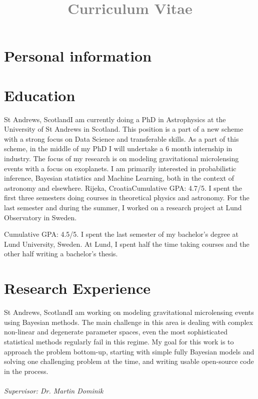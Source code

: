 \documentclass[11pt,a4paper,roman]{moderncv}
\title{\textcolor{gray}{ Curriculum Vitae}}
\begin{document}
\makecvtitle
\section{Personal information}
\section{Education}
{St Andrews, Scotland}{}{I am currently doing a PhD in Astrophysics at the University
of St Andrews in Scotland. This position is a part of a new scheme with a strong 
focus on Data Science and transferable skills. As a part of this scheme, in the middle
of my PhD I will undertake a 6 month internship in industry. The focus of my research
is on modeling gravitational microlensing events with a focus on exoplanets. I am 
primarily interested in probabilistic inference, Bayesian statistics and Machine 
Learning, both in the context of astronomy and elsewhere.}
{Rijeka, Croatia}{}{Cumulative GPA: 4.7/5. I spent the first three semesters 
doing courses in theoretical 
physics and astronomy. For the last semester and during the summer, I worked on 
a research project at Lund Observatory in Sweden.}

{Cumulative GPA: 4.5/5. I spent the last semester of my bachelor's degree at
Lund University, Sweden. At Lund, I spent half the time taking courses and the other
half writing a bachelor's thesis.}
\section{Research Experience}
{St Andrews, Scotland}{}{I am working on modeling gravitational microlensing events
using Bayesian methods. 
The main challenge in this area is dealing with complex non-linear and degenerate 
parameter spaces, even the most sophisticated statistical methods regularly 
fail in this regime. 
My goal for this work is to approach the problem bottom-up, starting with simple fully
Bayesian models and solving one challenging problem at the time, and writing usable
open-source code in the process.
\\\\
\emph{Supervisor: Dr. Martin Dominik}}
\end{document}
